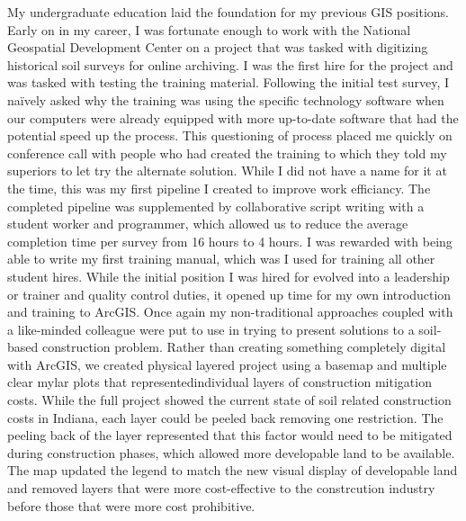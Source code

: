 \documentclass[12pt, letterpaper]{awesome-cv} %
\begin{document}
\begin{cvletter}
My undergraduate education laid the foundation for my previous GIS positions. Early on in my career, I was fortunate enough to work with the National Geospatial Development Center on a project that was tasked with digitizing historical soil surveys for online archiving. I was the first hire for the project and was tasked with testing the training material. Following the initial test survey, I naïvely asked why the training was using the specific technology software when our computers were already equipped with more up-to-date software that had the potential speed up the process. This questioning of process placed me quickly on conference call with people who had created the training to which they told my superiors to let try the alternate solution. While I did not have a name for it at the time, this was my first pipeline I created to improve work efficiancy. The completed pipeline was supplemented by collaborative script writing with a student worker and programmer, which allowed us to reduce the average completion time per survey from 16 hours to 4 hours. I was rewarded with being able to write my first training manual, which was I used for training all other student hires. While the initial position I was hired for evolved into a leadership or trainer and quality control duties, it opened up time for my own introduction and training to ArcGIS. Once again my non-traditional approaches coupled with a like-minded colleague were put to use in trying to present solutions to a soil-based construction problem. Rather than creating something completely digital with ArcGIS, we created physical layered project using a basemap and multiple clear mylar plots that representedindividual layers of construction mitigation costs. While the full project showed the current state of soil related construction costs in Indiana, each layer could be peeled back removing one restriction. The peeling back of the layer represented that this factor would need to be mitigated during construction phases, which allowed more developable land to be available. The map updated the legend to match the new visual display of developable land and removed layers that were more cost-effective to the constrcution industry before those that were more cost prohibitive. 


\end{cvletter}
\end{document}
